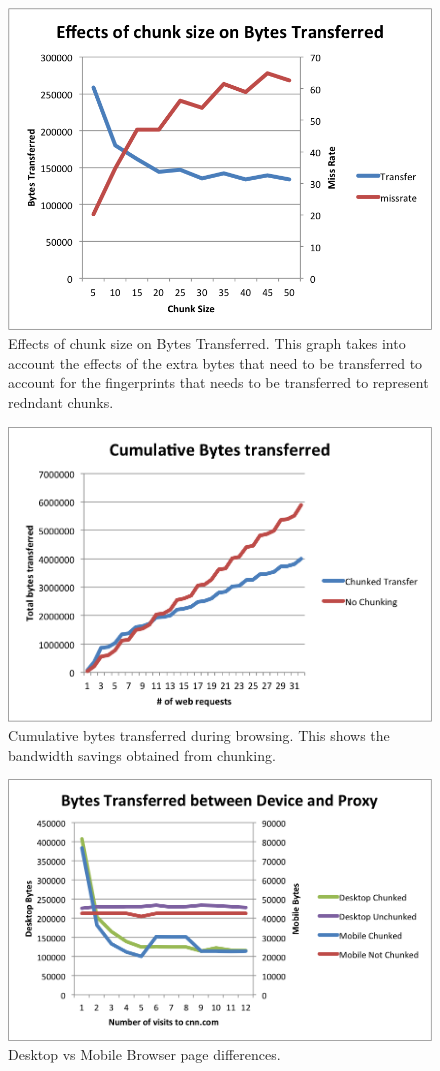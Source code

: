 \begin{figure}[h] 
\centering \includegraphics[scale=0.40]{images/chunksize2.png}
\caption{Effects of chunk size on Bytes Transferred. This graph takes into account the effects of the extra bytes that need to be transferred to account for the fingerprints that needs to be transferred to represent redndant chunks.}
\end{figure}

\begin{figure}[h] 
\centering \includegraphics[scale=0.40]{images/cumulbrowsing.png}
\caption{Cumulative bytes transferred during browsing. This shows the bandwidth savings obtained from chunking.}
\end{figure}

\begin{figure}[h] 
\centering \includegraphics[scale=0.40]{images/desktopmobile.png}
\caption{Desktop vs Mobile Browser page differences.}
\end{figure}

